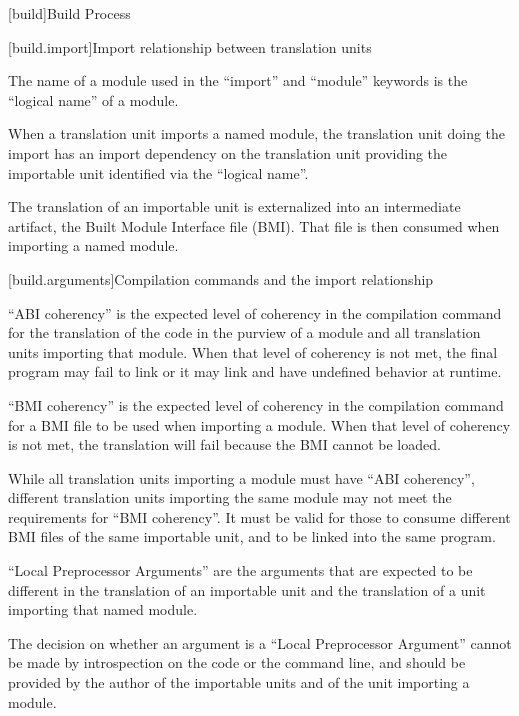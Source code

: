 
[build]{Build Process}

%

[build.import]{Import relationship between translation units}

\pnum The name of a module used in the ``import'' and ``module''
keywords is the ``logical name'' of a module.

\pnum When a translation unit imports a named module, the translation
unit doing the import has an import dependency on the translation unit
providing the importable unit identified via the ``logical name''.

\pnum The translation of an importable unit is externalized into an
intermediate artifact, the Built Module Interface file (BMI). That
file is then consumed when importing a named module.

[build.arguments]{Compilation commands and the import relationship}

\pnum ``ABI coherency'' is the expected level of coherency in the
compilation command for the translation of the code in the purview of a
module and all translation units importing that module. When that
level of coherency is not met, the final program may fail to link or
it may link and have undefined behavior at runtime.

\pnum ``BMI coherency'' is the expected level of coherency in the
compilation command for a BMI file to be used when importing a
module. When that level of coherency is not met, the translation will
fail because the BMI cannot be loaded.

\pnum While all translation units importing a module must have ``ABI
coherency'', different translation units importing the same module may
not meet the requirements for ``BMI coherency''. It must be valid for
those to consume different BMI files of the same importable unit, and
to be linked into the same program.

\pnum ``Local Preprocessor Arguments'' are the arguments that are
expected to be different in the translation of an importable unit and
the translation of a unit importing that named module.

\pnum The decision on whether an argument is a ``Local Preprocessor
Argument'' cannot be made by introspection on the code or the command
line, and should be provided by the author of the importable units
and of the unit importing a module.

